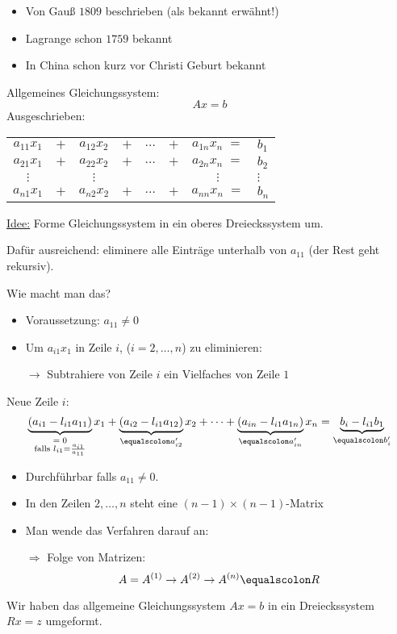 \begin{itemize}
\item Von Gauß $1809$ beschrieben (als bekannt erwähnt!)
\item Lagrange schon $1759$ bekannt
\item In China schon kurz vor Christi Geburt bekannt 
\end{itemize}
Allgemeines Gleichungssystem:
\begin{equation*}
Ax =b
\end{equation*}
Ausgeschrieben:
\begin{center}
\begin{tabular}{ c c c c c c c l }
$a_{11}x_1 $&$+$ & $ a_{12}x_2 $&$+ $ & $\dots$ & $+ $&$a_{1n}x_n \; =$ &  $b_1$
\\ $a_{21}x_1 $&$+$ & $ a_{22}x_2 $&$+ $ & $\dots$ & $+ $&$a_{2n}x_n \; =$ &  $b_2$
\\ $\vdots$&&$\vdots$&&&&$\vdots$&$\vdots$
\\ $a_{n1}x_1 $&$+$ & $ a_{n2}x_2 $&$+ $ & $\dots$ & $+ $&$a_{nn}x_n \; =$ &  $b_n$
\end{tabular}
\end{center}
\underline{Idee:} Forme Gleichungssystem in ein oberes Dreieckssystem um.

\medskip

Dafür ausreichend: eliminere alle Einträge unterhalb von $a_{11}$ (der Rest geht rekursiv).

\medskip

Wie macht man das?
\begin{itemize}
\item Voraussetzung: $a_{11} \neq 0$
\item Um $a_{i1}x_1$ in Zeile $i$, ($i = 2, \dots, n$) zu eliminieren:
\item[$\rightarrow$] Subtrahiere von Zeile $i$ ein Vielfaches von Zeile $1$
\end{itemize}
Neue Zeile $i$:
\begin{equation*}
\underbrace{(a_{i1} - l_{i1}a_{11})}_{\substack{= \; 0 \\ \textnormal{falls } l_{i1} = \frac{a_{i1}}{a_{11}}}} x_1 + \underbrace{(a_{i2} - l_{i1}a_{12})}_{\equalscolon a'_{i2}} x_2 + \dots +
\underbrace{(a_{in} - l_{i1}a_{1n})}_{\equalscolon a'_{in}} x_n =
\underbrace{b_i - l_{i1}b_1}_{\equalscolon b'_i}
\end{equation*}
\begin{itemize}
\item Durchführbar falls $a_{11} \neq 0$.
\item In den Zeilen $2, \dots, n$ steht eine $(n-1) \times (n-1)$-Matrix
\item Man wende das Verfahren darauf an:
\item[$\Rightarrow$] Folge von Matrizen:
\begin{equation*}
A = A^{(1)} \rightarrow A^{(2)} \rightarrow A^{(n)} \equalscolon R
\end{equation*}
\end{itemize}
Wir haben das allgemeine Gleichungssystem $Ax = b$ in ein Dreieckssystem $Rx = z$ umgeformt.

